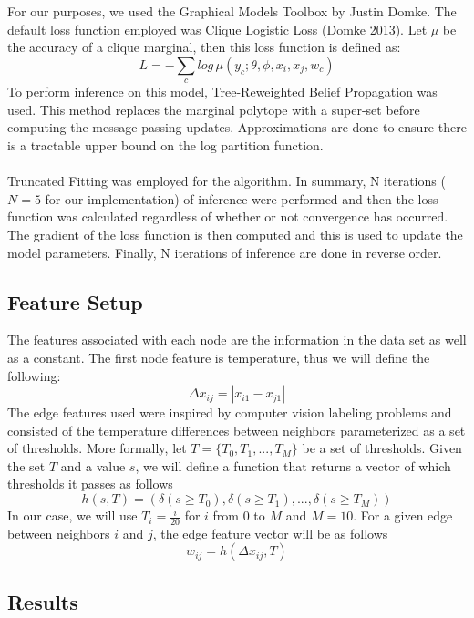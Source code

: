 For our purposes, we used the Graphical Models Toolbox by Justin Domke. The default loss function employed was Clique Logistic Loss (Domke 2013).  Let $\mu$ be the accuracy of a clique marginal, then this loss function is defined as:
\[
L = - \sum_c {log \, \mu(y_c; \theta, \phi, x_i, x_j, w_c)}
\]
To perform inference on this model, Tree-Reweighted Belief Propagation was used. This method replaces the marginal polytope with a super-set before computing the message passing updates. Approximations are done to ensure there is a tractable upper bound on the log partition function. \\
\\
Truncated Fitting was employed for the algorithm. In summary, N iterations ($N=5$ for our implementation) of inference were performed and then the loss function was calculated regardless of whether or not convergence has occurred. The gradient of the loss function is then computed and this is used to update the model parameters. Finally, N iterations of inference are done in reverse order. 

\subsection{Feature Setup}

The features associated with each node are the information in the data set as well as a constant. The first node feature is temperature, thus we will define the following:
\[
\Delta x_{ij} = |x_{i1} - x_{j1}|
\]
The edge features used were inspired by computer vision labeling problems and consisted of the temperature differences between neighbors parameterized as a set of thresholds. More formally, let $T = \{ T_0 , T_1, ..., T_M \}$ be a set of thresholds. Given the set $T$ and a value $s$, we will define a function that returns a vector of which thresholds it passes as follows
\[
h(s,T) = ( \delta (s \geq T_0), \delta (s \geq T_1), ..., \delta (s \geq T_M))
\]
In our case, we will use $T_i = \frac{i}{20}$ for $i$ from $0$ to $M$ and $M=10$. For a given edge between neighbors $i$ and $j$, the edge feature vector will be as follows
\[
w_{ij} = h( \Delta x_{ij}, T)
\] 

\subsection{Results}

